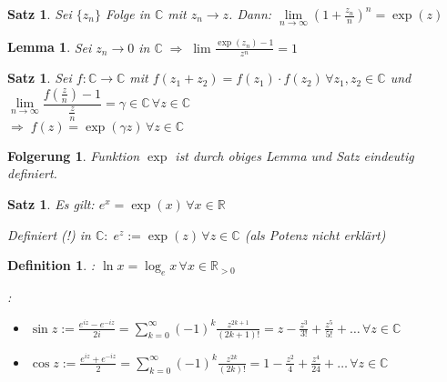 \documentclass[ngerman,a4paper]{report}
\theoremstyle{break}
\newtheorem{lemma}[theorem]{Lemma}
\newtheorem{satz}[theorem]{Satz}
\newtheorem*{definition}{Definition}
\newtheorem{conclusion}[theorem]{Folgerung}
\begin{document}
\begin{satz}
	Sei $\{z_n\}$ Folge in $\mathbb{C}$ mit $z_n\to z$. Dann: $\lim\limits_{n\rightarrow\infty} \left( 1 + \frac{z_n}{n}\right)^n = \exp (z)$
\end{satz}

\begin{lemma}
	Sei $z_n\to 0$ in $\mathbb{C}\;\Rightarrow\; \lim \frac{\exp(z_n) - 1}{z^n} = 1$
\end{lemma}

\begin{satz}
	Sei $f:\mathbb{C}\rightarrow\mathbb{C}$ mit $f(z_1 + z_2) = f(z_1) \cdot f(z_2) \,\forall z_1, z_2\in\mathbb{C}$ und $\lim\limits_{n\rightarrow\infty} \dfrac{f\left( \frac{z}{n}\right) - 1}{\frac{z}{n}} = \gamma\in\mathbb{C}\,\forall z\in\mathbb{C}$ \\
	$\Rightarrow \;f(z) = \exp(\gamma z)\,\forall z\in\mathbb{C}$
\end{satz}

\begin{conclusion}
	Funktion $\exp$ ist durch obiges Lemma und Satz eindeutig definiert.
\end{conclusion}
\begin{satz}
	Es gilt: $e^x = \exp (x) \,\forall x\in \mathbb{R}$
	
	Definiert (!) in $\mathbb{C}:\; e^z := \exp(z) \,\forall z\in\mathbb{C}$ (als Potenz nicht erklärt)
\end{satz}

\begin{definition}
	: $\ln x = \log_e x\,\forall x\in\mathbb{R}_{>0}$
	
	:
	\begin{itemize}
		\item $\sin z := \frac{e^{iz} - e^{-iz}}{2i} = \sum_{k=0}^\infty (-1)^k \frac{z^{2k+1}}{(2k+1)!} = z - \frac{z^3}{3!} + \frac{z^5}{5!}+ \dotsc \,\forall z\in\mathbb{C}$
		\item $\cos z := \frac{e^{iz}+e^{-iz}}{2} = \sum_{k=0}^\infty (-1)^k \frac{z^{2k}}{(2k)!} = 1 - \frac{z^2}{4} + \frac{z^4}{24}+\dotsc \,\forall z\in\mathbb{C}$
	\end{itemize}
\end{definition}
\end{document}
